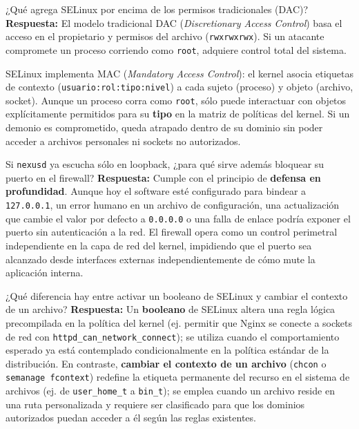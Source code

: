 \documentclass[10pt,a4paper]{article}
\begin{document}
\begin{pregunta}{¿Qué agrega SELinux por encima de los permisos tradicionales (DAC)?}
    \textbf{Respuesta:} El modelo tradicional DAC (\textit{Discretionary Access Control}) basa el acceso en el propietario y permisos del archivo (\texttt{rwxrwxrwx}). Si un atacante compromete un proceso corriendo como \texttt{root}, adquiere control total del sistema.
    
    SELinux implementa MAC (\textit{Mandatory Access Control}): el kernel asocia etiquetas de contexto (\texttt{usuario:rol:tipo:nivel}) a cada sujeto (proceso) y objeto (archivo, socket). Aunque un proceso corra como \texttt{root}, sólo puede interactuar con objetos explícitamente permitidos para su \textbf{tipo} en la matriz de políticas del kernel. Si un demonio es comprometido, queda atrapado dentro de su dominio sin poder acceder a archivos personales ni sockets no autorizados.
\end{pregunta}

\begin{pregunta}{Si \texttt{nexusd} ya escucha sólo en loopback, ¿para qué sirve además bloquear su puerto en el firewall?}
    \textbf{Respuesta:} Cumple con el principio de \textbf{defensa en profundidad}. Aunque hoy el software esté configurado para bindear a \texttt{127.0.0.1}, un error humano en un archivo de configuración, una actualización que cambie el valor por defecto a \texttt{0.0.0.0} o una falla de enlace podría exponer el puerto sin autenticación a la red. El firewall opera como un control perimetral independiente en la capa de red del kernel, impidiendo que el puerto sea alcanzado desde interfaces externas independientemente de cómo mute la aplicación interna.
\end{pregunta}

\begin{pregunta}{¿Qué diferencia hay entre activar un booleano de SELinux y cambiar el contexto de un archivo?}
    \textbf{Respuesta:} Un \textbf{booleano} de SELinux altera una regla lógica precompilada en la política del kernel (ej. permitir que Nginx se conecte a sockets de red con \texttt{httpd\_can\_network\_connect}); se utiliza cuando el comportamiento esperado ya está contemplado condicionalmente en la política estándar de la distribución. En contraste, \textbf{cambiar el contexto de un archivo} (\texttt{chcon} o \texttt{semanage fcontext}) redefine la etiqueta permanente del recurso en el sistema de archivos (ej. de \texttt{user\_home\_t} a \texttt{bin\_t}); se emplea cuando un archivo reside en una ruta personalizada y requiere ser clasificado para que los dominios autorizados puedan acceder a él según las reglas existentes.
\end{pregunta}
\end{document}
